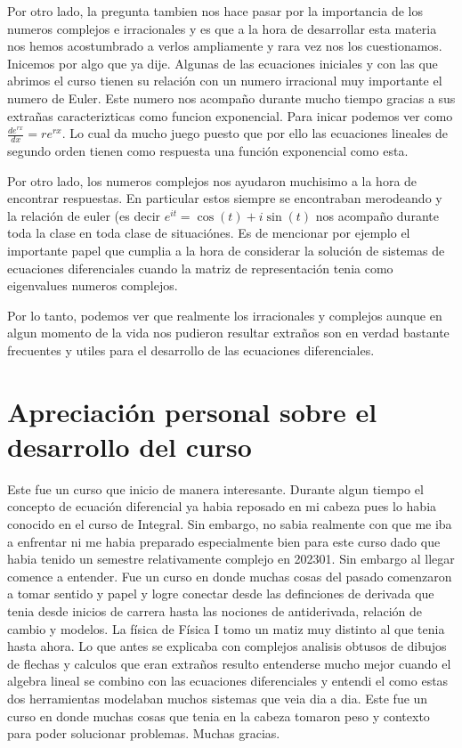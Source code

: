 \documentclass{report}
\begin{document}
Por otro lado, la pregunta tambien nos hace pasar por la importancia de los numeros complejos e irracionales y es que a la hora de desarrollar esta materia nos hemos acostumbrado a verlos ampliamente y rara vez nos los cuestionamos. Inicemos por algo que ya dije. Algunas de las ecuaciones iniciales y con las que abrimos el curso tienen su relación con un numero irracional muy importante el numero de Euler. Este numero nos acompaño durante mucho tiempo gracias a sus extrañas caracterizticas como funcion exponencial. Para inicar podemos ver como $\frac{d e^{rx}}{dx}=re^{rx}$. Lo cual da mucho juego puesto que por ello las ecuaciones lineales de segundo orden tienen como respuesta una función exponencial como esta.

Por otro lado, los numeros complejos nos ayudaron muchisimo a la hora de encontrar respuestas. En particular estos siempre se encontraban merodeando y la relación de euler (es decir $e^{it}=\cos\left( t \right) + i\sin\left( t \right) $ nos acompaño durante toda la clase en toda clase de situaciónes. Es de mencionar por ejemplo el importante papel que cumplia a la hora de considerar la solución de sistemas de ecuaciones diferenciales cuando la matriz de representación tenia como eigenvalues numeros complejos.

Por lo tanto, podemos ver que realmente los irracionales y complejos aunque en algun momento de la vida nos pudieron resultar extraños son en verdad bastante frecuentes y utiles para el desarrollo de las ecuaciones diferenciales. 

\chapter{Apreciación personal sobre el desarrollo del curso}

Este fue un curso que inicio de manera interesante. Durante algun tiempo el concepto de ecuación diferencial ya habia reposado en mi cabeza pues lo habia conocido en el curso de Integral. Sin embargo, no sabia realmente con que me iba a enfrentar ni me habia preparado especialmente bien para este curso dado que habia tenido un semestre relativamente complejo en 202301. Sin embargo al llegar comence a entender. Fue un curso en donde muchas cosas del pasado comenzaron a tomar sentido y papel y logre conectar desde las definciones de derivada que tenia desde inicios de carrera hasta las nociones de antiderivada, relación de cambio y modelos. La física de Física I tomo un matiz muy distinto al que tenia hasta ahora. Lo que antes se explicaba con complejos analisis obtusos de dibujos de flechas y calculos que eran extraños resulto entenderse mucho mejor cuando el algebra lineal se combino con las ecuaciones diferenciales y entendi el como estas dos herramientas modelaban muchos sistemas que veia dia a dia. Este fue un curso en donde muchas cosas que tenia en la cabeza tomaron peso y contexto para poder solucionar problemas. Muchas gracias.
\end{document}

